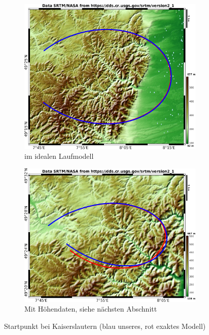 \documentclass[
    paper=a4,
    DIV14,
    fontsize=12pt,
    pagesize=pdftex,
    toc=bibliographynumbered
]{scrartcl}
\numberwithin{figure}{section}
\numberwithin{equation}{section}
\numberwithin{table}{section}
\begin{document}
\begin{figure}[hbt]
    \centering
    \begin{subfigure}{0.47\textwidth}
        \centering
        \includegraphics[width=0.98\textwidth]{images/sunposdiffideal.png}
        \caption{im idealen Laufmodell}
    \end{subfigure}
    \begin{subfigure}{0.51\textwidth}
        \centering
        \includegraphics[width=0.98\textwidth]{images/sunposdiffele.png}
        \caption{Mit Höhendaten, siehe nächsten Abschnitt}
    \end{subfigure}
    \caption{Startpunkt bei Kaiserslautern (blau unseres, rot exaktes Modell)}
    \label{fig:sunposmoddiff}
\end{figure}
\end{document}
